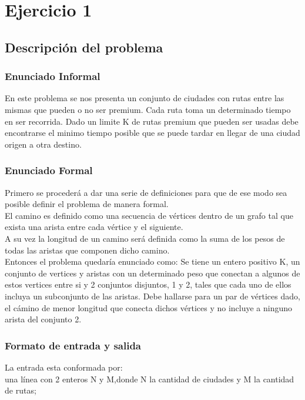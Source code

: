 \section{Ejercicio 1}

\subsection{Descripción del problema}

\subsubsection{Enunciado Informal}

En este problema se nos presenta un conjunto de ciudades con rutas entre las mismas que pueden o no ser premium. Cada ruta toma un determinado tiempo en ser recorrida. Dado un limite K de rutas premium que pueden ser usadas debe encontrarse el minimo tiempo posible que se puede tardar en llegar de una ciudad origen a otra destino.

\subsubsection{Enunciado Formal}
Primero se procederá a dar una serie de definiciones para que de ese modo sea posible definir el problema de manera formal.\\
El camino es definido como una secuencia de vértices dentro de un grafo tal que exista una arista entre cada vértice y el siguiente.\\
A su vez la longitud de un camino será definida como la suma de los pesos de todas las aristas que componen dicho camino.\\
Entonces el problema quedaría enunciado como:
Se tiene un entero positivo K, un conjunto de vertices y aristas con un determinado peso que conectan a algunos de estos vertices entre si y 2 conjuntos disjuntos, 1 y 2, tales que cada uno de ellos incluya un subconjunto de las aristas. Debe hallarse para un par de vértices dado, el cámino de menor longitud que conecta dichos vértices y no incluye a ninguno arista del conjunto 2.
\subsubsection{Formato de entrada y salida}
La entrada esta conformada por:\\

una línea con 2 enteros N y M,donde N la cantidad de ciudades y M la cantidad de rutas;\\

